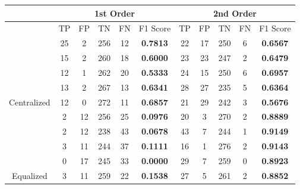\documentclass[10pt,a4paper]{article}
\begin{document}
		\begin{table}[!h]
			\centering
			\begin{tabular}{|c|c|c|c|c|c|c|c|c|c|c|}
				\hline
				& \multicolumn{5}{c|}{1st Order}                                                     & \multicolumn{5}{c|}{2nd Order}                              \\ \hline
				& TP & FP & TN  & FN                        & F1 Score                               & TP & FP & TN  & FN & F1 Score                               \\ \hline
				& 25 & 2  & 256 & {\color[HTML]{333333} 12} & {\color[HTML]{FE0000} \textbf{0.7813}} & 22 & 17 & 250 & 6  & {\color[HTML]{FE0000} \textbf{0.6567}} \\ \cline{2-11} 
				& 15 & 2  & 260 & {\color[HTML]{333333} 18} & {\color[HTML]{FE0000} \textbf{0.6000}} & 23 & 23 & 247 & 2  & {\color[HTML]{FE0000} \textbf{0.6479}} \\ \cline{2-11} 
				& 12 & 1  & 262 & {\color[HTML]{333333} 20} & {\color[HTML]{FE0000} \textbf{0.5333}} & 24 & 15 & 250 & 6  & {\color[HTML]{FE0000} \textbf{0.6957}} \\ \cline{2-11} 
				& 13 & 2  & 267 & {\color[HTML]{333333} 13} & {\color[HTML]{FE0000} \textbf{0.6341}} & 28 & 27 & 235 & 5  & {\color[HTML]{FE0000} \textbf{0.6364}} \\ \cline{2-11} 
				\multirow{-5}{*}{Centralized} & 12 & 0  & 272 & {\color[HTML]{333333} 11} & {\color[HTML]{FE0000} \textbf{0.6857}} & 21 & 29 & 242 & 3  & {\color[HTML]{FE0000} \textbf{0.5676}} \\ \hline
				& 2  & 12 & 256 & {\color[HTML]{333333} 25} & {\color[HTML]{FE0000} \textbf{0.0976}} & 20 & 3  & 270 & 2  & {\color[HTML]{FE0000} \textbf{0.8889}} \\ \cline{2-11} 
				& 2  & 12 & 238 & {\color[HTML]{333333} 43} & {\color[HTML]{FE0000} \textbf{0.0678}} & 43 & 7  & 244 & 1  & {\color[HTML]{FE0000} \textbf{0.9149}} \\ \cline{2-11} 
				& 3  & 11 & 244 & {\color[HTML]{333333} 37} & {\color[HTML]{FE0000} \textbf{0.1111}} & 16 & 1  & 276 & 2  & {\color[HTML]{FE0000} \textbf{0.9143}} \\ \cline{2-11} 
				& 0  & 17 & 245 & {\color[HTML]{333333} 33} & {\color[HTML]{FE0000} \textbf{0.0000}} & 29 & 7  & 259 & 0  & {\color[HTML]{FE0000} \textbf{0.8923}} \\ \cline{2-11} 
				\multirow{-5}{*}{Equalized}   & 3  & 11 & 259 & {\color[HTML]{333333} 22} & {\color[HTML]{FE0000} \textbf{0.1538}} & 27 & 5  & 261 & 2  & {\color[HTML]{FE0000} \textbf{0.8852}} \\ \hline
			\end{tabular}
		\end{table}
	
\end{document}
